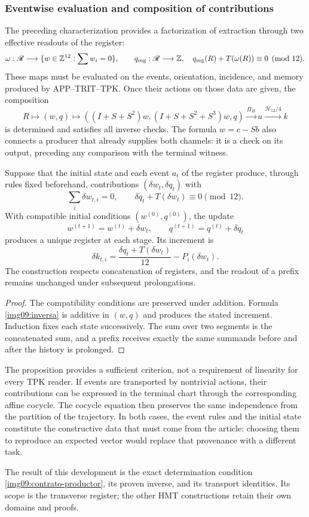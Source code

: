 \subsubsection{Eventwise evaluation and composition of contributions}

The preceding characterization provides a factorization of extraction through two
effective readouts of the register:
\begin{equation}
 \omega:\mathscr R\longrightarrow
 \{w\in\mathbb Z^{12}:\sum w_i=0\},\qquad
 q_{\rm reg}:\mathscr R\longrightarrow\mathbb Z,
 \quad q_{\rm reg}(R)+T(\omega(R))\equiv0\pmod {12}.
 \label{img09:contrato-productor}
\end{equation}
These maps must be evaluated on the events, orientation,
incidence, and memory produced by APP--TRIT--TPK. Once their
actions on those data are given, the composition
\[
 R\longmapsto(w,q)\longmapsto
 ((I+S+S^2)w,(I+S+S^2+S^3)w,q)
 \xrightarrow{\Pi_H}u\xrightarrow{\mathcal H_{12}/4}k
\]
is determined and satisfies all inverse checks. The formula
$w=c-Sb$ also connects a producer that already supplies both
channels: it is a check on its output, preceding any comparison
with the terminal witness.

\begin{proposition}
\label{img09:acumulacion}
Suppose that the initial state and each event $a_t$ of the register
produce, through rules fixed beforehand, contributions
$(\delta w_t,\delta q_t)$ with
\[
 \sum_i\delta w_{t,i}=0,\qquad
 \delta q_t+T(\delta w_t)\equiv0\pmod {12}.
\]
With compatible initial conditions $(w^{(0)},q^{(0)})$, the
update
\[
 w^{(t+1)}=w^{(t)}+\delta w_t,\qquad
 q^{(t+1)}=q^{(t)}+\delta q_t
\]
produces a unique register at each stage. Its increment is
\[
 \delta k_{t,i}=
 \frac{\delta q_t+T(\delta w_t)}{12}-P_i(\delta w_t).
\]
The construction respects concatenation of registers, and the readout
of a prefix remains unchanged under subsequent prolongations.
\end{proposition}
\begin{proof}
The compatibility conditions are preserved under addition. Formula
\eqref{img09:inversa} is additive in $(w,q)$ and produces the
stated increment. Induction fixes each state successively.
The sum over two segments is the concatenated sum, and a prefix receives
exactly the same summands before and after the history is prolonged.
\end{proof}

The proposition provides a sufficient criterion, not a requirement of
linearity for every TPK reader. If events are transported by nontrivial
actions, their contributions can be expressed in the terminal chart
through the corresponding affine cocycle. The cocycle equation then
preserves the same independence from the partition of the trajectory.
In both cases, the event rules and the initial state constitute the
constructive data that must come from the article: choosing them to
reproduce an expected vector would replace that provenance with a different task.

The result of this development is the exact determination condition
\eqref{img09:contrato-productor}, its proven inverse, and its transport
identities. Its scope is the transverse register; the other
HMT constructions retain their own domains and proofs.
